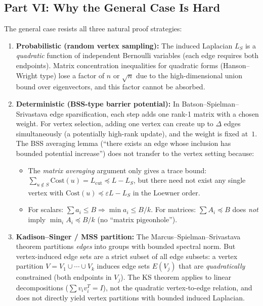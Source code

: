 \subsection*{Part VI: Why the General Case Is Hard}

The general case resists all three natural proof strategies:

\begin{enumerate}
\item \textbf{Probabilistic (random vertex sampling):} The induced Laplacian $L_S$ is a \emph{quadratic} function of independent Bernoulli variables (each edge requires both endpoints). Matrix concentration inequalities for quadratic forms (Hanson--Wright type) lose a factor of $n$ or $\sqrt{n}$ due to the high-dimensional union bound over eigenvectors, and this factor cannot be absorbed.

\item \textbf{Deterministic (BSS-type barrier potential):} In Batson--Spielman--Srivastava edge sparsification, each step adds one rank-1 matrix with a chosen weight. For vertex selection, adding one vertex can create up to $\Delta$ edges simultaneously (a potentially high-rank update), and the weight is fixed at~$1$. The BSS averaging lemma (``there exists an edge whose inclusion has bounded potential increase'') does not transfer to the vertex setting because:
\begin{itemize}
\item The \emph{matrix averaging} argument only gives a trace bound: $\sum_{u\notin S}\mathrm{Cost}(u)=L_{\mathrm{cut}}\preceq L-L_S$, but there need not exist any single vertex with $\mathrm{Cost}(u)\preceq\varepsilon L-L_S$ in the Loewner order.
\item For scalars: $\sum a_i\le B\Rightarrow\min a_i\le B/k$. For matrices: $\sum A_i\preceq B$ does \emph{not} imply $\min_i A_i\preceq B/k$ (no ``matrix pigeonhole'').
\end{itemize}

\item \textbf{Kadison--Singer / MSS partition:} The Marcus--Spielman--Srivastava theorem partitions \emph{edges} into groups with bounded spectral norm. But vertex-induced edge sets are a strict subset of all edge subsets: a vertex partition $V=V_1\cup\cdots\cup V_k$ induces edge sets $E(V_j)$ that are \emph{quadratically} constrained (both endpoints in $V_j$). The KS theorem applies to linear decompositions ($\sum v_iv_i^T=I$), not the quadratic vertex-to-edge relation, and does not directly yield vertex partitions with bounded induced Laplacian.
\end{enumerate}

